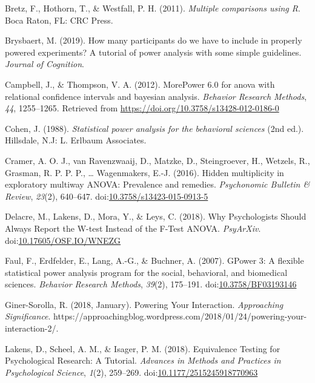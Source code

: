 \documentclass[
  ,man,floatsintext]{apa6}
\begin{document}
\leavevmode\hypertarget{ref-bretz_multiple_2011}{}%
Bretz, F., Hothorn, T., \& Westfall, P. H. (2011). \emph{Multiple comparisons using R}. Boca Raton, FL: CRC Press.

\leavevmode\hypertarget{ref-brysbaert_how_2019}{}%
Brysbaert, M. (2019). How many participants do we have to include in properly powered experiments? A tutorial of power analysis with some simple guidelines. \emph{Journal of Cognition}.

\leavevmode\hypertarget{ref-Campbell2012MorePower6F}{}%
Campbell, J., \& Thompson, V. A. (2012). MorePower 6.0 for anova with relational confidence intervals and bayesian analysis. \emph{Behavior Research Methods}, \emph{44}, 1255--1265. Retrieved from \url{https://doi.org/10.3758/s13428-012-0186-0}

\leavevmode\hypertarget{ref-cohen_statistical_1988}{}%
Cohen, J. (1988). \emph{Statistical power analysis for the behavioral sciences} (2nd ed.). Hillsdale, N.J: L. Erlbaum Associates.

\leavevmode\hypertarget{ref-cramer_hidden_2016}{}%
Cramer, A. O. J., van Ravenzwaaij, D., Matzke, D., Steingroever, H., Wetzels, R., Grasman, R. P. P. P., \ldots{} Wagenmakers, E.-J. (2016). Hidden multiplicity in exploratory multiway ANOVA: Prevalence and remedies. \emph{Psychonomic Bulletin \& Review}, \emph{23}(2), 640--647. doi:\href{https://doi.org/10.3758/s13423-015-0913-5}{10.3758/s13423-015-0913-5}

\leavevmode\hypertarget{ref-delacre_why_2018}{}%
Delacre, M., Lakens, D., Mora, Y., \& Leys, C. (2018). Why Psychologists Should Always Report the W-test Instead of the F-Test ANOVA. \emph{PsyArXiv}. doi:\href{https://doi.org/10.17605/OSF.IO/WNEZG}{10.17605/OSF.IO/WNEZG}

\leavevmode\hypertarget{ref-faul_gpower_2007}{}%
Faul, F., Erdfelder, E., Lang, A.-G., \& Buchner, A. (2007). GPower 3: A flexible statistical power analysis program for the social, behavioral, and biomedical sciences. \emph{Behavior Research Methods}, \emph{39}(2), 175--191. doi:\href{https://doi.org/10.3758/BF03193146}{10.3758/BF03193146}

\leavevmode\hypertarget{ref-giner-sorolla_powering_2018}{}%
Giner-Sorolla, R. (2018, January). Powering Your Interaction. \emph{Approaching Significance}. https://approachingblog.wordpress.com/2018/01/24/powering-your-interaction-2/.

\leavevmode\hypertarget{ref-lakens_equivalence_2018}{}%
Lakens, D., Scheel, A. M., \& Isager, P. M. (2018). Equivalence Testing for Psychological Research: A Tutorial. \emph{Advances in Methods and Practices in Psychological Science}, \emph{1}(2), 259--269. doi:\href{https://doi.org/10.1177/2515245918770963}{10.1177/2515245918770963}
\end{document}

